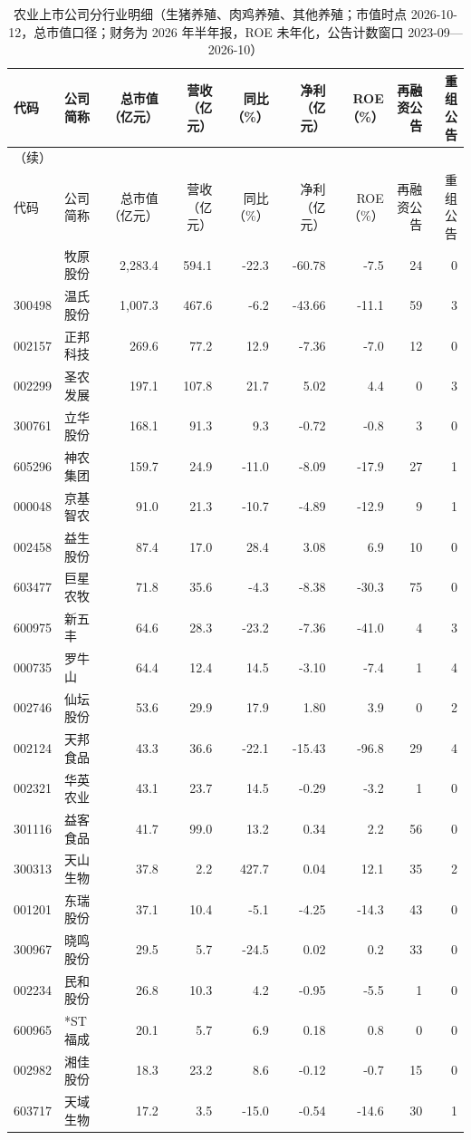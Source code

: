\begingroup\scriptsize\setlength{\tabcolsep}{2pt}
\begin{longtable}{@{}llrrrrrrr@{}}
\caption{农业上市公司分行业明细（生猪养殖、肉鸡养殖、其他养殖；市值时点 2026-10-12，总市值口径；财务为 2026 年半年报，ROE 未年化，公告计数窗口 2023-09---2026-10）}\label{tab:comp-breeding}\\
\toprule
代码 & 公司简称 & 总市值（亿元） & 营收（亿元） & 同比（\%） & 净利（亿元） & ROE（\%） & 再融资公告 & 重组公告 \\
\midrule
\endfirsthead
\multicolumn{9}{l}{\small（续）}\\
\toprule
代码 & 公司简称 & 总市值（亿元） & 营收（亿元） & 同比（\%） & 净利（亿元） & ROE（\%） & 再融资公告 & 重组公告 \\
\midrule
\endhead
\bottomrule
\endlastfoot
002714 & 牧原股份 & 2,283.4 & 594.1 & -22.3 & -60.78 & -7.5 & 24 & 0 \\
300498 & 温氏股份 & 1,007.3 & 467.6 & -6.2 & -43.66 & -11.1 & 59 & 3 \\
002157 & 正邦科技 & 269.6 & 77.2 & 12.9 & -7.36 & -7.0 & 12 & 0 \\
002299 & 圣农发展 & 197.1 & 107.8 & 21.7 & 5.02 & 4.4 & 0 & 3 \\
300761 & 立华股份 & 168.1 & 91.3 & 9.3 & -0.72 & -0.8 & 3 & 0 \\
605296 & 神农集团 & 159.7 & 24.9 & -11.0 & -8.09 & -17.9 & 27 & 1 \\
000048 & 京基智农 & 91.0 & 21.3 & -10.7 & -4.89 & -12.9 & 9 & 1 \\
002458 & 益生股份 & 87.4 & 17.0 & 28.4 & 3.08 & 6.9 & 10 & 0 \\
603477 & 巨星农牧 & 71.8 & 35.6 & -4.3 & -8.38 & -30.3 & 75 & 0 \\
600975 & 新五丰 & 64.6 & 28.3 & -23.2 & -7.36 & -41.0 & 4 & 3 \\
000735 & 罗牛山 & 64.4 & 12.4 & 14.5 & -3.10 & -7.4 & 1 & 4 \\
002746 & 仙坛股份 & 53.6 & 29.9 & 17.9 & 1.80 & 3.9 & 0 & 2 \\
002124 & 天邦食品 & 43.3 & 36.6 & -22.1 & -15.43 & -96.8 & 29 & 4 \\
002321 & 华英农业 & 43.1 & 23.7 & 14.5 & -0.29 & -3.2 & 1 & 0 \\
301116 & 益客食品 & 41.7 & 99.0 & 13.2 & 0.34 & 2.2 & 56 & 0 \\
300313 & 天山生物 & 37.8 & 2.2 & 427.7 & 0.04 & 12.1 & 35 & 2 \\
001201 & 东瑞股份 & 37.1 & 10.4 & -5.1 & -4.25 & -14.3 & 43 & 0 \\
300967 & 晓鸣股份 & 29.5 & 5.7 & -24.5 & 0.02 & 0.2 & 33 & 0 \\
002234 & 民和股份 & 26.8 & 10.3 & 4.2 & -0.95 & -5.5 & 1 & 0 \\
600965 & *ST福成 & 20.1 & 5.7 & 6.9 & 0.18 & 0.8 & 0 & 0 \\
002982 & 湘佳股份 & 18.3 & 23.2 & 8.6 & -0.12 & -0.7 & 15 & 0 \\
603717 & 天域生物 & 17.2 & 3.5 & -15.0 & -0.54 & -14.6 & 30 & 1 \\
\end{longtable}
\endgroup
